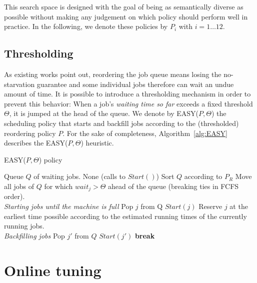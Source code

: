 \documentclass[sigconf,review,anonymous]{acmart}
\begin{document}
This search space is designed with the goal of being as semantically diverse as
possible without making any judgement on which policy should perform well in
practice. In the following, we denote these policies by $P_i$ with $i = 1
\ldots 12$.

\subsection{Thresholding}
\label{sub:th}
As existing works point out, reordering the job queue means losing the
no-starvation guarantee and some individual jobs therefore can wait an undue
amount of time. It is possible to introduce a thresholding mechanism in order
to prevent this behavior: When a job's \textit{waiting time so far} exceeds a
fixed threshold $\Theta$, it is jumped at the head of the queue. We denote by
EASY($P,\Theta$) the scheduling policy that starts and backfill jobs according to
the (thresholded) reordering policy $P$. For the sake of completeness,
Algorithm~\ref{alg:EASY} describes the EASY($P,\Theta$) heuristic.

\begin{algorithm}[]
  \caption{EASY($P,\Theta$) policy}
  \begin{algorithmic}[1]
    \renewcommand{\algorithmicrequire}{\textbf{Input:}}
    \renewcommand{\algorithmicensure}{\textbf{Output:}}
    \REQUIRE Queue $Q$ of waiting jobs.
    \ENSURE None (calls to $Start()$)
    \STATE Sort $Q$ according to $P_R$
    \STATE Move all jobs of $Q$ for which $wait_j > \Theta$ ahead
    of the queue (breaking ties in FCFS order).
    \\ \textit{Starting jobs until the machine is full}
    \STATE Pop $j$ from Q
    \STATE $Start(j)$
    \ELSE
    \STATE Reserve $j$ at the earliest
    time possible according to the estimated running times
    of the currently running jobs.
    \\ \textit{Backfilling jobs}
    \STATE Pop $j'$ from $Q$
    \STATE $Start(j')$
    \ENDIF
    \ENDFOR
    \STATE \textbf{break}
    \ENDIF
    \ENDFOR
  \end{algorithmic}
  \label{alg:EASY}
\end{algorithm}


\section{Online tuning}
\label{sec:online}
\end{document}

